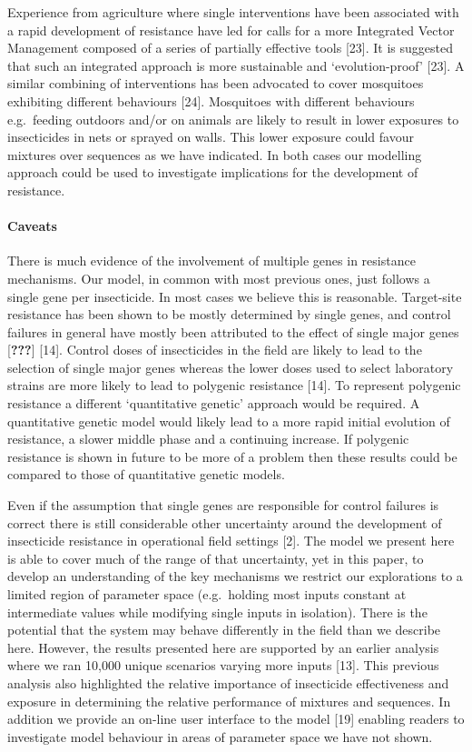\documentclass[11pt,]{article}
\let\oldparagraph\paragraph
\renewcommand{\paragraph}[1]{\oldparagraph{#1}\mbox{}}
\begin{document}
Experience from agriculture where single interventions have been
associated with a rapid development of resistance have led for calls for
a more Integrated Vector Management composed of a series of partially
effective tools {[}23{]}. It is suggested that such an integrated
approach is more sustainable and `evolution-proof' {[}23{]}. A similar
combining of interventions has been advocated to cover mosquitoes
exhibiting different behaviours {[}24{]}. Mosquitoes with different
behaviours e.g.~feeding outdoors and/or on animals are likely to result
in lower exposures to insecticides in nets or sprayed on walls. This
lower exposure could favour mixtures over sequences as we have
indicated. In both cases our modelling approach could be used to
investigate implications for the development of resistance.

\paragraph{Caveats}\label{caveats}

There is much evidence of the involvement of multiple genes in
resistance mechanisms. Our model, in common with most previous ones,
just follows a single gene per insecticide. In most cases we believe
this is reasonable. Target-site resistance has been shown to be mostly
determined by single genes, and control failures in general have mostly
been attributed to the effect of single major genes {[}{\textbf{???}}{]}
{[}14{]}. Control doses of insecticides in the field are likely to lead
to the selection of single major genes whereas the lower doses used to
select laboratory strains are more likely to lead to polygenic
resistance {[}14{]}. To represent polygenic resistance a different
`quantitative genetic' approach would be required. A quantitative
genetic model would likely lead to a more rapid initial evolution of
resistance, a slower middle phase and a continuing increase. If
polygenic resistance is shown in future to be more of a problem then
these results could be compared to those of quantitative genetic models.

Even if the assumption that single genes are responsible for control
failures is correct there is still considerable other uncertainty around
the development of insecticide resistance in operational field settings
{[}2{]}. The model we present here is able to cover much of the range of
that uncertainty, yet in this paper, to develop an understanding of the
key mechanisms we restrict our explorations to a limited region of
parameter space (e.g.~holding most inputs constant at intermediate
values while modifying single inputs in isolation). There is the
potential that the system may behave differently in the field than we
describe here. However, the results presented here are supported by an
earlier analysis where we ran 10,000 unique scenarios varying more
inputs {[}13{]}. This previous analysis also highlighted the relative
importance of insecticide effectiveness and exposure in determining the
relative performance of mixtures and sequences. In addition we provide
an on-line user interface to the model {[}19{]} enabling readers to
investigate model behaviour in areas of parameter space we have not
shown.
\end{document}
